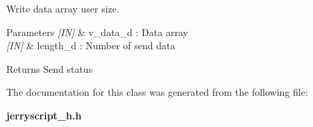Write data array user size. 


\begin{DoxyCode}{0}
\DoxyCodeLine{\textcolor{comment}{// Send only 2 char from array}}
\end{DoxyCode}



\begin{DoxyParams}{Parameters}
{\em \mbox{[}\+I\+N\mbox{]}} & v\+\_\+data\+\_\+d \+: Data array \\
\hline
{\em \mbox{[}\+I\+N\mbox{]}} & length\+\_\+d \+: Number of send data \\
\hline
\end{DoxyParams}
\begin{DoxyReturn}{Returns}
Send status 
\end{DoxyReturn}


The documentation for this class was generated from the following file\+:\begin{DoxyCompactItemize}
\item 
\textbf{ jerryscript\+\_\+h.\+h}\end{DoxyCompactItemize}
